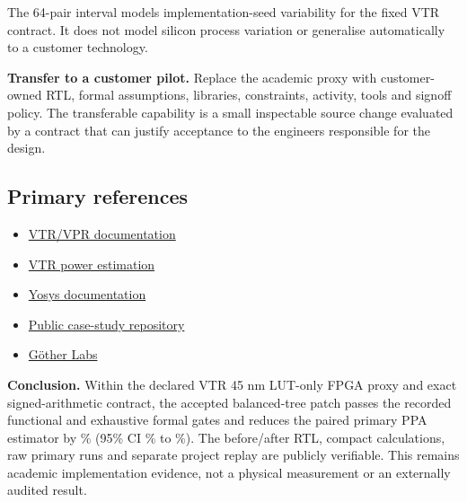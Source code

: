 \documentclass[10pt,a4paper]{article}
\begin{document}
The 64-pair interval models implementation-seed variability for the fixed VTR contract. It does not model silicon process variation or generalise automatically to a customer technology.

\begin{claimbox}
\textbf{Transfer to a customer pilot.} Replace the academic proxy with customer-owned RTL, formal assumptions, libraries, constraints, activity, tools and signoff policy. The transferable capability is a small inspectable source change evaluated by a contract that can justify acceptance to the engineers responsible for the design.
\end{claimbox}

\subsection{Primary references}
\begin{itemize}
  \item \href{https://docs.verilogtorouting.org/en/latest/vpr/}{VTR/VPR documentation}
  \item \href{https://docs.verilogtorouting.org/en/latest/vtr/power_estimation/}{VTR power estimation}
  \item \href{https://yosyshq.readthedocs.io/projects/yosys/en/latest/}{Yosys documentation}
  \item \href{https://github.com/juan-fernandez-gotherlabs/rtl-optimization-case-study}{Public case-study repository}
  \item \href{https://www.gotherlabs.com/}{Göther Labs}
\end{itemize}

\vspace{6mm}
\begin{claimbox}
\textbf{Conclusion.} Within the declared VTR 45 nm LUT-only FPGA proxy and exact signed-arithmetic contract, the accepted balanced-tree patch passes the recorded functional and exhaustive formal gates and reduces the paired primary PPA estimator by \CompositeImprovement\% (95\% CI \CompositeLow\% to \CompositeHigh\%). The before/after RTL, compact calculations, raw primary runs and separate project replay are publicly verifiable. This remains academic implementation evidence, not a physical measurement or an externally audited result.
\end{claimbox}
\end{document}

